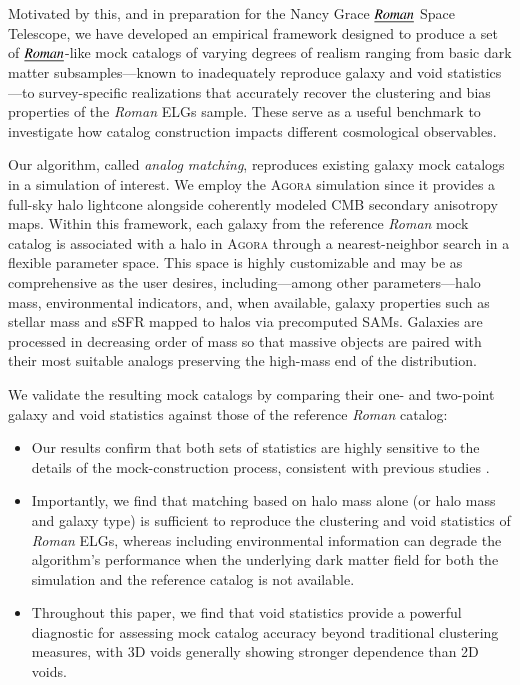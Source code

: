 \documentclass[]{aa} %
\begin{document}
Motivated by this, and in preparation for the Nancy Grace $\emph{Roman}$ Space Telescope, we have developed an empirical framework designed to produce a set of $\emph{Roman}$-like mock catalogs of varying degrees of realism ranging from basic dark matter subsamples---known to inadequately reproduce galaxy and void statistics \citep{nadathur2015_impact_mocks_in_voids}---to survey-specific realizations that accurately recover the clustering and bias properties of the \emph{Roman} ELGs sample. These serve as a useful benchmark to investigate how catalog construction impacts different cosmological observables. 

Our algorithm, called \emph{analog matching}, reproduces existing galaxy mock catalogs in a simulation of interest. We employ the \textsc{Agora} simulation since it provides a full-sky halo lightcone alongside coherently modeled CMB secondary anisotropy maps. Within this framework, each galaxy from the reference \emph{Roman} mock catalog is associated with a halo in \textsc{Agora} through a nearest-neighbor search in a flexible parameter space. This space is highly customizable and may be as comprehensive as the user desires, including---among other parameters---halo mass, environmental indicators, and, when available, galaxy properties such as stellar mass and sSFR mapped to halos via precomputed SAMs. Galaxies are processed in decreasing order of mass so that massive objects are paired with their most suitable analogs preserving the high-mass end of the distribution.

We validate the resulting mock catalogs by comparing their one- and two-point galaxy and void statistics against those of the reference \emph{Roman} catalog:

\begin{itemize}
    \item[\textbullet] Our results confirm that both sets of statistics are highly sensitive to the details of the mock-construction process, consistent with previous studies \citep{berlind&weinberg2002_impact_mocks_in_voids, tinker2006_impact_mocks_in_voids, sutter2013_impact_mocks_in_voids, sutter2014_impact_mocks_in_voids, nadathur2015_impact_mocks_in_voids, contarini2019_impact_mocks_in_voids, salcedo2025_impact_mocks_in_voids}. 
    \smallskip
    \item[\textbullet] Importantly, we find that matching based on halo mass alone (or halo mass and galaxy type) is sufficient to reproduce the clustering and void statistics of \emph{Roman} ELGs, whereas including environmental information can degrade the algorithm's performance when the underlying dark matter field for both the simulation and the reference catalog is not available. 
    \smallskip
    \item[\textbullet] Throughout this paper, we find that void statistics provide a powerful diagnostic for assessing mock catalog accuracy beyond traditional clustering measures, with 3D voids generally showing stronger dependence than 2D voids. 
\end{itemize}
\end{document}
